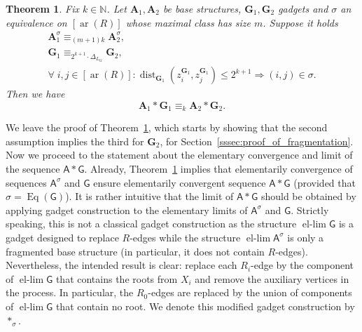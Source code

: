 \documentclass[11pt]{article}
\theoremstyle{plain}
\newtheorem{theorem}{Theorem}[section]
\theoremstyle{definition}
\theoremstyle{remark}
\DeclareMathOperator\dist{dist}
\DeclareMathOperator\Eq{Eq}
\DeclareMathOperator\aritysym{ar}
\newcommand{\arity}[1]{{\aritysym({#1})}}
\newcommand{\N}{\mathbb{N}}
\newcommand{\str}[1]{\mathbf{#1}}
\newcommand{\strseq}[1]{{\boldsymbol{\mathsf{#1}}}}
\newcommand{\maxarity}[1]{\Delta_{#1}}
\DeclareMathOperator{\ellim}{el-lim}
\begin{document}
\begin{theorem}\label{thm:elementary_equivalence_using_fragmentation}
    Fix $k \in \N$.
    Let $\str{A}_1, \str{A}_2$ be base structures, $\str{G}_1, \str{G}_2$ gadgets and $\sigma$ an equivalence on $[\arity{R}]$ whose maximal class has size $m$.
    Suppose it holds
    \begin{equation*}
        \begin{gathered} \str{A}^\sigma_1 \equiv_{(m+1)k} \str{A}^\sigma_2
            , \\
            \str{G}_1 \equiv_{2^{k+1}\cdot\maxarity{L_G}} \str{G}_2
            , \\
            \forall\; i,j \in [\arity{R}]: \dist_{\str{G}_1}(z_i^{\str{G}_1}, z_j^{\str{G}_1}) \leq 2^{k+1} \Rightarrow (i,j) \in \sigma
            .
        \end{gathered}
    \end{equation*}
    Then we have
    \[
        \str{A}_1 * \str{G}_1 \equiv_k \str{A}_2 * \str{G}_2
        .
    \]
\end{theorem}

We leave the proof of Theorem~\ref{thm:elementary_equivalence_using_fragmentation}, which starts by showing that the second assumption implies the third for $\str{G}_2$, for Section~\ref{sssec:proof_of_fragmentation}.
Now we proceed to the statement about the elementary convergence and limit of the sequence $\strseq{A} * \strseq{G}$.
Already, Theorem~\ref{thm:elementary_equivalence_using_fragmentation} implies that elementarily convergence of sequences $\strseq{A}^\sigma$ and $\strseq{G}$ ensure elementarily convergent sequence $\strseq{A}*\strseq{G}$ (provided that $\sigma = \Eq(\strseq{G})$).
It is rather intuitive that the limit of $\strseq{A}*\strseq{G}$ should be obtained by applying gadget construction to the elementary limits of $\strseq{A}^\sigma$ and $\strseq{G}$.
Strictly speaking, this is not a classical gadget construction as the structure $\ellim \strseq{G}$ is a gadget designed to replace $R$-edges while the structure $\ellim \strseq{A}^\sigma$ is only a fragmented base structure (in particular, it does not contain $R$-edges).
Nevertheless, the intended result is clear: replace each $R_i$-edge by the component of $\ellim \strseq{G}$ that contains the roots from $X_i$ and remove the auxiliary vertices in the process.
In particular, the $R_0$-edges are replaced by the union of components of $\ellim \strseq{G}$ that contain no root.
We denote this modified gadget construction by $*_\sigma$.
\end{document}
